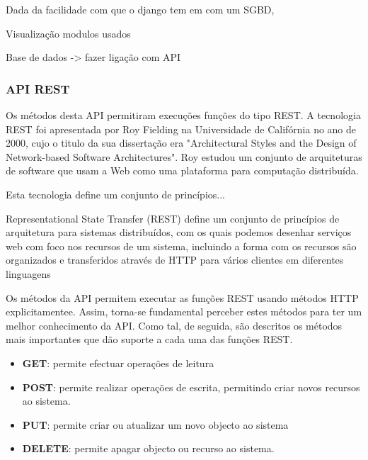 Dada da facilidade com que o django tem em  com um SGBD, 



Visualização modulos usados 




Base de dados -> fazer ligação com API 













\newpage
\subsubsection{\acs{API} \acs{REST}}


Os métodos desta API permitiram execuções funções do tipo \ac{REST}. A tecnologia \ac{REST} foi apresentada por Roy Fielding na Universidade de Califórnia no ano de 2000, cujo o titulo da sua dissertação era "Architectural Styles and the Design of Network-based Software Architectures". Roy estudou um conjunto de arquiteturas de software que usam a Web como uma plataforma para computação distribuída\cite{Rodriguez2015}. 

 
 
Esta tecnologia define um conjunto de princípios...   

 
Representational State Transfer (REST) define um conjunto de princípios de arquitetura para
sistemas distribuídos, com os quais podemos desenhar serviços web com foco nos recursos de um
sistema, incluindo a forma com os recursos são organizados e transferidos através de HTTP para
vários clientes em diferentes linguagens




Os métodos da API permitem executar as funções REST usando métodos HTTP explicitamentee. Assim, torna-se fundamental perceber estes métodos para ter um melhor conhecimento da API. Como tal, de seguida, são descritos os métodos mais importantes que dão suporte a cada uma das funções REST.


\begin{itemize}
	\item \textbf{GET}: permite efectuar operações de leitura 
	\item \textbf{POST}: permite realizar operações de escrita, permitindo criar novos recursos ao sistema.
	\item \textbf{PUT}: permite criar ou atualizar um novo objecto ao sistema 
	\item \textbf{DELETE}: permite apagar objecto ou recurso ao sistema. 
\end{itemize}







